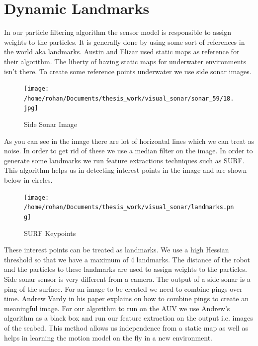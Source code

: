 \documentclass[12pt]{dalcsthesis}
\begin{document}
\section{Dynamic Landmarks}
In our particle filtering algorithm the sensor model is responsible to assign weights to the particles. It is generally done by using some sort of references in the world aka landmarks. Austin and Elizar used static maps as reference for their algorithm. The liberty of having static maps for underwater environments isn't there. To create some reference points underwater we use side sonar images.
\begin{figure}[hbtp]
\caption{Side Sonar Image}
\centering
\texttt{[image: /home/rohan/Documents/thesis\_work/visual\_sonar/sonar\_59/18.jpg]}
\end{figure}
As you can see in the image there are lot of horizontal lines which we can treat as noise. In order to get rid of  these we use a median filter on the image. In order to generate some landmarks we run feature extractions techniques such as SURF. This algorithm helps us in detecting interest points in the image and are shown below in circles. 
\begin{figure}[hbtp]
\caption{SURF Keypoints}
\centering
\texttt{[image: /home/rohan/Documents/thesis\_work/visual\_sonar/landmarks.png]}
\end{figure}

These interest points can be treated as landmarks. We use a high Hessian
threshold so that we have a maximum of 4 landmarks. The distance of the robot and the particles to these landmarks are used to assign weights to the particles.
\\
Side sonar sensor is very different from a camera. The output of a side sonar is a ping of the surface. For an image to be created we need to combine pings over time. Andrew Vardy in his paper explains on how to combine pings to create an meaningful image. For our algorithm to run on the AUV we use Andrew's algorithm as a black box and run our feature extraction on the output i.e. images of the seabed. 
This method allows us independence from a static map as well as helps in learning
the motion model on the fly in a new environment. 
\end{document}
